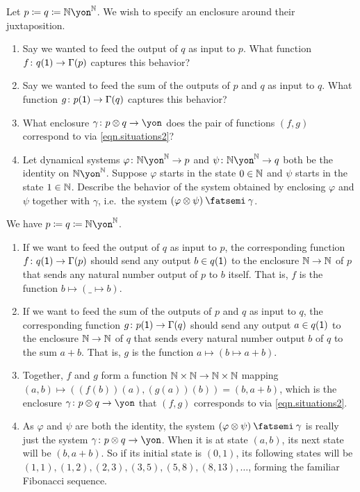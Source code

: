 \documentclass[Book-Poly]{subfiles}
\begin{document}
\begin{exercise}
Let $p\coloneqq q\coloneqq\nn\yon^\nn$.
We wish to specify an enclosure around their juxtaposition.
\begin{enumerate}
    \item Say we wanted to feed the output of $q$ as input to $p$.
    What function $f\colon q(\textsf{1})\to\Gamma(p)$ captures this behavior?
    \item Say we wanted to feed the sum of the outputs of $p$ and $q$ as input to $q$.
    What function $g\colon p(\textsf{1})\to\Gamma(q)$ captures this behavior?
    \item What enclosure $\gamma\colon p\otimes q\to\yon$ does the pair of functions $(f,g)$ correspond to via \eqref{eqn.situations2}?
	\item Let dynamical systems $\varphi\colon\nn\yon^\nn\to p$ and $\psi\colon\nn\yon^\nn\to q$ both be the identity on $\nn\yon^\nn$.
	Suppose $\varphi$ starts in the state $0\in\mathbb{N}$ and $\psi$ starts in the state $1\in\mathbb{N}$.
	Describe the behavior of the system obtained by enclosing $\varphi$ and $\psi$ together with $\gamma$, i.e.\ the system $(\varphi\otimes\psi)\then\gamma$.
\qedhere
\end{enumerate}
\begin{solution}
We have $p\coloneqq q\coloneqq\nn\yon^\nn$.
\begin{enumerate}
    \item If we want to feed the output of $q$ as input to $p$, the corresponding function $f\colon q(\textsf{1})\to\Gamma(p)$ should send any output $b\in q(\textsf{1})$ to the enclosure $\mathbb{N}\to\mathbb{N}$ of $p$ that sends any natural number output of $p$ to $b$ itself.
    That is, $f$ is the function $b\mapsto(\_\mapsto b)$.
    \item If we want to feed the sum of the outputs of $p$ and $q$ as input to $q$, the corresponding function $g\colon p(\textsf{1})\to\Gamma(q)$ should send any output $a\in q(\textsf{1})$ to the enclosure $\mathbb{N}\to\mathbb{N}$ of $q$ that sends every natural number output $b$ of $q$ to the sum $a+b$.
    That is, $g$ is the function $a\mapsto(b\mapsto a+b)$.
    \item Together, $f$ and $g$ form a function $\mathbb{N}\times\mathbb{N}\to\mathbb{N}\times\mathbb{N}$ mapping $(a,b)\mapsto((f(b))(a),(g(a))(b))=(b,a+b)$, which is the enclosure $\gamma\colon p\otimes q\to\yon$ that $(f,g)$ corresponds to via \eqref{eqn.situations2}.
    \item As $\varphi$ and $\psi$ are both the identity, the system $(\varphi\otimes\psi)\then\gamma$ is really just the system $\gamma\colon p\otimes q\to\yon$.
    When it is at state $(a,b)$, its next state will be $(b,a+b)$.
    So if its initial state is $(0,1)$, its following states will be $(1,1),(1,2),(2,3),(3,5),(5,8),(8,13),\ldots$, forming the familiar Fibonacci sequence. 
\end{enumerate}
\end{solution}
\end{exercise}
\end{document}
